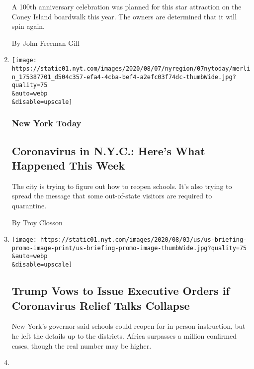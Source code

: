 \begin{enumerate}
  A 100th anniversary celebration was planned for this star attraction
  on the Coney Island boardwalk this year. The owners are determined
  that it will spin again.

  By John Freeman Gill
\item
  \href{/2020/08/07/nyregion/coronavirus-nyc.html}{}

  \texttt{[image: https://static01.nyt.com/images/2020/08/07/nyregion/07nytoday/merlin\_175387701\_d504c357-efa4-4cba-bef4-a2efc03f74dc-thumbWide.jpg?quality=75\\\&auto=webp\\\&disable=upscale]}

  \hypertarget{new-york-today}{%
  \subsubsection{New York Today}\label{new-york-today}}

  \hypertarget{coronavirus-in-nyc-heres-what-happened-this-week}{%
  \subsection{Coronavirus in N.Y.C.: Here's What Happened This
  Week}\label{coronavirus-in-nyc-heres-what-happened-this-week}}

  The city is trying to figure out how to reopen schools. It's also
  trying to spread the message that some out-of-state visitors are
  required to quarantine.~

  By Troy Closson
\item
  \href{/2020/08/07/world/covid-19-news.html}{}

  \texttt{[image: https://static01.nyt.com/images/2020/08/03/us/us-briefing-promo-image-print/us-briefing-promo-image-thumbWide.jpg?quality=75\\\&auto=webp\\\&disable=upscale]}

  \hypertarget{trump-vows-to-issue-executive-orders-if-coronavirus-relief-talks-collapse}{%
  \subsection{Trump Vows to Issue Executive Orders if Coronavirus Relief
  Talks
  Collapse}\label{trump-vows-to-issue-executive-orders-if-coronavirus-relief-talks-collapse}}

  New York's governor said schools could reopen for in-person
  instruction, but he left the details up to the districts. Africa
  surpasses a million confirmed cases, though the real number may be
  higher.
\item
  \href{/2020/08/07/style/coronavirus-nyc-historic-season.html}{}


\end{enumerate}

